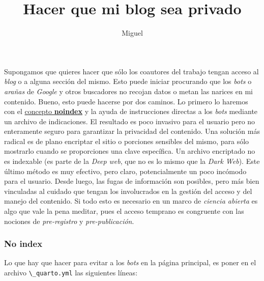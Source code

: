 \documentclass[
  letterpaper,
  DIV=11,
  numbers=noendperiod]{scrartcl}
\title{Hacer que mi blog sea privado}
\author{Miguel}
\date{}
\begin{document}
\maketitle


Supongamos que quieres hacer que sólo los coautores del trabajo tengan
acceso al \emph{blog} o a alguna sección del mismo. Esto puede iniciar
procurando que los \emph{bots} o \emph{arañas} de \emph{Google} y otros
buscadores no recojan datos o metan las narices en mi contenido. Bueno,
esto puede hacerse por dos caminos. Lo primero lo haremos con el
\href{https://seranking.com/es/blog/noindex/}{concepto \textbf{noindex}}
y la ayuda de instrucciones directas a los \emph{bots} mediante un
archivo de indicaciones. El resultado es poco invasivo para el usuario
pero no enteramente seguro para garantizar la privacidad del contenido.
Una solución más radical es de plano encriptar el sitio o porciones
sensibles del mismo, para sólo mostrarlo cuando se proporciones una
clave específica. Un archivo encriptado no es indexable (es parte de la
\emph{Deep web}, que no es lo mismo que la \emph{Dark Web}). Este último
método es muy efectivo, pero claro, potencialmente un poco incómodo para
el usuario. Desde luego, las fugas de información son posibles, pero más
bien vinculadas al cuidado que tengan los involucrados en la gestión del
acceso y del manejo del contenido. Si todo esto es necesario en un marco
de \emph{ciencia abierta} es algo que vale la pena meditar, pues el
acceso temprano es congruente con las nociones de \emph{pre-registro} y
\emph{pre-publicación}.

\subsubsection{No index}\label{no-index}

Lo que hay que hacer para evitar a los \emph{bots} en la página
principal, es poner en el archivo \texttt{\textbackslash{}\_quarto.yml}
las siguientes líneas:
\end{document}
